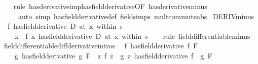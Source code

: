 \begin{isabellebody}
%
\isadelimproof
\ \ %
\endisadelimproof
%
\isatagproof
{}\isamarkupfalse%
\ {\isacharparenleft}{\kern0pt}rule\ has{\isacharunderscore}{\kern0pt}derivative{\isacharunderscore}{\kern0pt}imp{\isacharunderscore}{\kern0pt}has{\isacharunderscore}{\kern0pt}field{\isacharunderscore}{\kern0pt}derivative{\isacharbrackleft}{\kern0pt}OF\ has{\isacharunderscore}{\kern0pt}derivative{\isacharunderscore}{\kern0pt}minus{\isacharbrackright}{\kern0pt}{\isacharparenright}{\kern0pt}\isanewline
\ \ \ \ \ {\isacharparenleft}{\kern0pt}auto\ simp{\isacharcolon}{\kern0pt}\ has{\isacharunderscore}{\kern0pt}field{\isacharunderscore}{\kern0pt}derivative{\isacharunderscore}{\kern0pt}def\ field{\isacharunderscore}{\kern0pt}simps\ mult{\isacharunderscore}{\kern0pt}commute{\isacharunderscore}{\kern0pt}abs{\isacharparenright}{\kern0pt}%
\endisatagproof
{\isafoldproof}%
%
\isadelimproof
\isanewline
%
\endisadelimproof
\isanewline
{}\isamarkupfalse%
\ DERIV{\isacharunderscore}{\kern0pt}minus{\isacharcolon}{\kern0pt}\isanewline
\ \ {\isachardoublequoteopen}{\isacharparenleft}{\kern0pt}f\ has{\isacharunderscore}{\kern0pt}field{\isacharunderscore}{\kern0pt}derivative\ D{\isacharparenright}{\kern0pt}\ {\isacharparenleft}{\kern0pt}at\ x\ within\ s{\isacharparenright}{\kern0pt}\ {\isasymLongrightarrow}\isanewline
\ \ \ \ {\isacharparenleft}{\kern0pt}{\isacharparenleft}{\kern0pt}{\isasymlambda}x{\isachardot}{\kern0pt}\ {\isacharminus}{\kern0pt}\ f\ x{\isacharparenright}{\kern0pt}\ has{\isacharunderscore}{\kern0pt}field{\isacharunderscore}{\kern0pt}derivative\ {\isacharminus}{\kern0pt}D{\isacharparenright}{\kern0pt}\ {\isacharparenleft}{\kern0pt}at\ x\ within\ s{\isacharparenright}{\kern0pt}{\isachardoublequoteclose}\isanewline
%
\isadelimproof
\ \ %
\endisadelimproof
%
\isatagproof
{}\isamarkupfalse%
\ {\isacharparenleft}{\kern0pt}rule\ field{\isacharunderscore}{\kern0pt}differentiable{\isacharunderscore}{\kern0pt}minus{\isacharparenright}{\kern0pt}%
\endisatagproof
{\isafoldproof}%
%
\isadelimproof
\isanewline
%
\endisadelimproof
\isanewline
{}\isamarkupfalse%
\ field{\isacharunderscore}{\kern0pt}differentiable{\isacharunderscore}{\kern0pt}diff{\isacharbrackleft}{\kern0pt}derivative{\isacharunderscore}{\kern0pt}intros{\isacharbrackright}{\kern0pt}{\isacharcolon}{\kern0pt}\isanewline
\ \ {\isachardoublequoteopen}{\isacharparenleft}{\kern0pt}f\ has{\isacharunderscore}{\kern0pt}field{\isacharunderscore}{\kern0pt}derivative\ f{\isacharprime}{\kern0pt}{\isacharparenright}{\kern0pt}\ F\ {\isasymLongrightarrow}\isanewline
\ \ \ \ {\isacharparenleft}{\kern0pt}g\ has{\isacharunderscore}{\kern0pt}field{\isacharunderscore}{\kern0pt}derivative\ g{\isacharprime}{\kern0pt}{\isacharparenright}{\kern0pt}\ F\ {\isasymLongrightarrow}\ {\isacharparenleft}{\kern0pt}{\isacharparenleft}{\kern0pt}{\isasymlambda}z{\isachardot}{\kern0pt}\ f\ z\ {\isacharminus}{\kern0pt}\ g\ z{\isacharparenright}{\kern0pt}\ has{\isacharunderscore}{\kern0pt}field{\isacharunderscore}{\kern0pt}derivative\ f{\isacharprime}{\kern0pt}\ {\isacharminus}{\kern0pt}\ g{\isacharprime}{\kern0pt}{\isacharparenright}{\kern0pt}\ F{\isachardoublequoteclose}\isanewline

\end{isabellebody}
